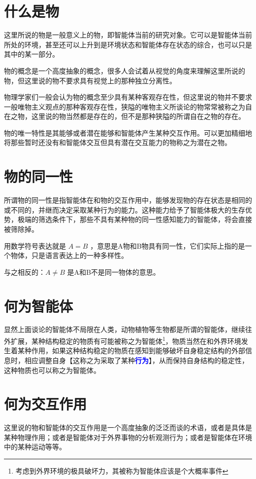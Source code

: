 \documentclass[12pt,oneside]{book}
\renewcommand{\emph}[1]{\textcolor{blue}{\textbf{#1}}}
\begin{document}
\section{什么是物}
这里所说的物是一般意义上的物，即智能体当前的研究对象。它可以是智能体当前所处的环境，甚至还可以上升到是环境状态和智能体存在状态的综合，也可以只是其中的某一部分。

物的概念是一个高度抽象的概念，很多人会试着从视觉的角度来理解这里所说的物，但这里说的物不要求具有视觉上的那种独立分离性。

物理学家们一般会认为物的概念至少具有某种客观存在性，但这里说的物并不要求一般唯物主义观点的那种客观存在性，狭隘的唯物主义所谈论的物常常被称之为自在之物，这里说的物当然都是存在的，但不是那种狭隘的所谓自在之物的存在。

物的唯一特性是其能够或者潜在能够和智能体产生某种交互作用。可以更加精细地将那些暂时还没有和智能体交互但具有潜在交互能力的物称之为潜在之物。

\section{物的同一性}
所谓物的同一性是指智能体在和物的交互作用中，能够发现物的存在状态是相同的或不同的，并继而决定采取某种行为的能力。这种能力给予了智能体极大的生存优势，极端的筛选条件下，那些不具有某种物的同一性感知能力的智能体，将会直接被筛除掉。

用数学符号表达就是 $A=B$ ，意思是A物和B物具有同一性，它们实际上指的是一个物体，只是语言表达上的一种多样性。

与之相反的：$A \neq B$ 是A和B不是同一物体的意思。


\section{何为智能体}
显然上面谈论的智能体不局限在人类，动物植物等生物都是所谓的智能体，继续往外扩展，某种结构稳定的物质有可能被称之为智能体\footnote{考虑到外界环境的极具破坏力，其被称为智能体应该是个大概率事件}，物质当然在和外界环境发生着某种作用，如果这种结构稳定的物质在感知到能够破坏自身稳定结构的外部信息时，相应调整自身【这称之为采取了某种\emph{行为}】，从而保持自身结构的稳定性，这种物质也可以称之为智能体。


\section{何为交互作用}
这里说的物和智能体的交互作用是一个高度抽象的泛泛而谈的术语，或者是具体是某种物理作用；或者是智能体对于外界事物的分析观测行为；或者是智能体在环境中的某种运动等等。
\end{document}
